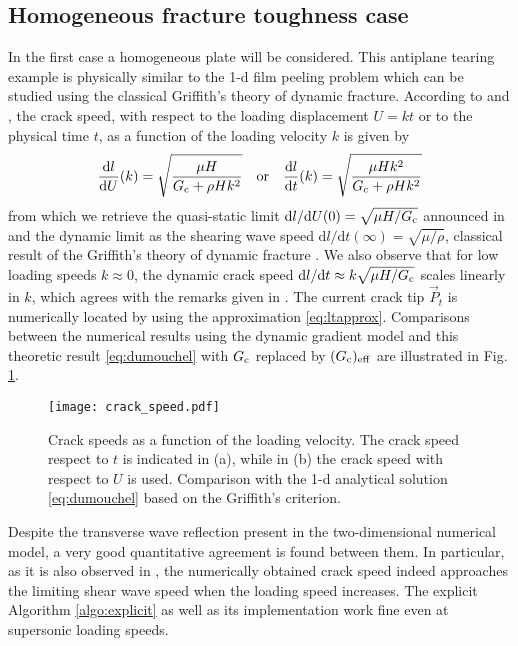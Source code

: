 \subsection{Homogeneous fracture toughness case} \label{sec:homo}
In the first case a homogeneous plate will be considered. This antiplane tearing example is physically similar to the 1-d film peeling problem which can be studied using the classical Griffith's theory of dynamic fracture. According to \cite{DumouchelMarigoCharlotte:2008} and \cite{BourdinFrancfortMarigo:2008}, the crack speed, with respect to the loading displacement $U=kt$ or to the physical time $t$, as a function of the loading velocity $k$ is given by
\begin{equation} \label{eq:dumouchel}
\frac{\mathrm{d} l}{\mathrm{d} U}(k)=\sqrt{\frac{\mu H}{G_\mathrm{c}+\rho Hk^2}}\quad\text{or}\quad\frac{\mathrm{d} l}{\mathrm{d} t}(k)=\sqrt{\frac{\mu Hk^2}{G_\mathrm{c}+\rho Hk^2}}
\end{equation}
from which we retrieve the quasi-static limit $\mathrm{d} l/\mathrm{d} U(0)=\sqrt{\mu H/G_\mathrm{c}}$ announced in \cite{BourdinFrancfortMarigo:2008} and the dynamic limit as the shearing wave speed $\mathrm{d} l/\mathrm{d} t(\infty)=\sqrt{\mu/\rho}$, classical result of the Griffith's theory of dynamic fracture \cite{Freund:1990}. We also observe that for low loading speeds $k\approx 0$, the dynamic crack speed $\mathrm{d} l/\mathrm{d} t\approx k\sqrt{\mu H/G_\mathrm{c}}$ scales linearly in $k$, which agrees with the remarks given in \cite{Bourdin:2011}. The current crack tip $\vec{P}_t$ is numerically located by using the approximation \eqref{eq:ltapprox}. Comparisons between the numerical results using the dynamic gradient model and this theoretic result \eqref{eq:dumouchel} with $G_\mathrm{c}$ replaced by $(G_\mathrm{c})_\mathrm{eff}$ are illustrated in Fig. \ref{fig:mode3}.
\begin{figure}[htbp]
\centering
\texttt{[image: crack\_speed.pdf]}
\caption{Crack speeds as a function of the loading velocity. The crack speed respect to $t$ is indicated in (a), while in (b) the crack speed with respect to $U$ is used. Comparison with the 1-d analytical solution \eqref{eq:dumouchel} based on the Griffith's criterion.} \label{fig:mode3}
\end{figure}
Despite the transverse wave reflection present in the two-dimensional numerical model, a very good quantitative agreement is found between them. In particular, as it is also observed in \cite{Bourdin:2011}, the numerically obtained crack speed indeed approaches the limiting shear wave speed when the loading speed increases. The explicit Algorithm \ref{algo:explicit} as well as its implementation work fine even at supersonic loading speeds.

